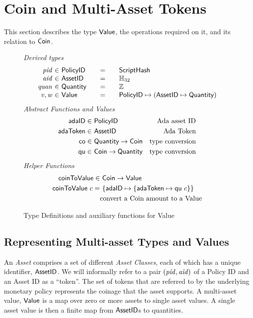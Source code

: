 \section{Coin and Multi-Asset Tokens}
\label{sec:coin-ma}

This section describes the type $\mathsf{Value}$, the operations required on
it, and its relation to $\mathsf{Coin}$.

\begin{figure*}[t!]
  \emph{Derived types}
  \begin{equation*}
    \begin{array}{r@{~\in~}l@{\qquad=\qquad}lr}
      \var{pid} & \PolicyID & \ScriptHash \\
      \var{aid} & \AssetID & \mathbb{H}_{32}\\
      \var{quan} & \Quantity & \Z \\
      \var{v}, \var{w} & \Value
      & \PolicyID \mapsto ( \AssetID \mapsto \Quantity ) \\
    \end{array}
  \end{equation*}
  \emph{Abstract Functions and Values}
  \begin{align*}
    \mathsf{adaID} \in& ~\mathsf{PolicyID}
    & \text{Ada asset ID} \\
    \mathsf{adaToken} \in& ~\mathsf{AssetID}
    & \text{Ada Token} \\
    \mathsf{co} \in& ~\mathsf{Quantity} \to \mathsf{Coin}
    & \text{type conversion} \\
    \mathsf{qu} \in& ~\mathsf{Coin} \to \mathsf{Quantity}
    & \text{type conversion} \\
  \end{align*}
  \emph{Helper Functions}
  \begin{align*}
    \mathsf{coinToValue} \in & ~\mathsf{Coin}\to \mathsf{Value} \\
    \mathsf{coinToValue}~ c = & ~\{\mathsf{adaID} \mapsto \{\mathsf{adaToken} \mapsto \mathsf{qu}~c\}\} \\
    &\text{convert a Coin amount to a Value} \\
  \end{align*}
  \caption{Type Definitions and auxiliary functions for Value}
  \label{fig:defs:value}
\end{figure*}

\subsection*{Representing Multi-asset Types and Values}
An \emph{Asset} comprises a set of different \emph{Asset Classes}, each of which has
a unique identifier, $\mathsf{AssetID}$. We will informally refer to a pair $(\mathit{pid}, \mathit{aid})$ of a Policy ID and an Asset ID as a ``token''.
The set of tokens that are referred to by the underlying monetary policy represents the coinage that the asset supports.  A multi-asset value, $\mathsf{Value}$ is a map over zero or more assets
to single asset values.  A single asset value is then a finite map from
$\mathsf{AssetID}$s to quantities.

